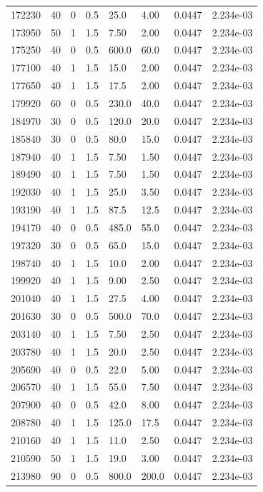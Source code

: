 \documentclass[preview]{standalone}
\begin{document}
{{{{\begin{tabular}{L{1.2cm}C{1.2cm} C{0.3cm}C{0.5cm} C{1.4cm}C{1.4cm} C{1.4cm}C{1.4cm}}
  172230  &    40  & 0     & 0.5 &  25.0  & 4.00  & 0.0447 &  2.234e-03   \\ 
  173950  &    50  & 1     & 1.5 &  7.50  & 2.00  & 0.0447 &  2.234e-03   \\ 
  175250  &    40  & 0     & 0.5 &  600.0  & 60.0  & 0.0447 &  2.234e-03   \\ 
  177100  &    40  & 1     & 1.5 &  15.0  & 2.00  & 0.0447 &  2.234e-03   \\ 
  177650  &    40  & 1     & 1.5 &  17.5  & 2.00  & 0.0447 &  2.234e-03   \\ 
  179920  &    60  & 0     & 0.5 &  230.0  & 40.0  & 0.0447 &  2.234e-03   \\ 
  184970  &    30  & 0     & 0.5 &  120.0  & 20.0  & 0.0447 &  2.234e-03   \\ 
  185840  &    30  & 0     & 0.5 &  80.0  & 15.0  & 0.0447 &  2.234e-03   \\ 
  187940  &    40  & 1     & 1.5 &  7.50  & 1.50  & 0.0447 &  2.234e-03   \\ 
  189490  &    40  & 1     & 1.5 &  7.50  & 1.50  & 0.0447 &  2.234e-03   \\ 
  192030  &    40  & 1     & 1.5 &  25.0  & 3.50  & 0.0447 &  2.234e-03   \\ 
  193190  &    40  & 1     & 1.5 &  87.5  & 12.5  & 0.0447 &  2.234e-03   \\ 
  194170  &    40  & 0     & 0.5 &  485.0  & 55.0  & 0.0447 &  2.234e-03   \\ 
  197320  &    30  & 0     & 0.5 &  65.0  & 15.0  & 0.0447 &  2.234e-03   \\ 
  198740  &    40  & 1     & 1.5 &  10.0  & 2.00  & 0.0447 &  2.234e-03   \\ 
  199920  &    40  & 1     & 1.5 &  9.00  & 2.50  & 0.0447 &  2.234e-03   \\ 
  201040  &    40  & 1     & 1.5 &  27.5  & 4.00  & 0.0447 &  2.234e-03   \\ 
  201630  &    30  & 0     & 0.5 &  500.0  & 70.0  & 0.0447 &  2.234e-03   \\ 
  203140  &    40  & 1     & 1.5 &  7.50  & 2.50  & 0.0447 &  2.234e-03   \\ 
  203780  &    40  & 1     & 1.5 &  20.0  & 2.50  & 0.0447 &  2.234e-03   \\ 
  205690  &    40  & 0     & 0.5 &  22.0  & 5.00  & 0.0447 &  2.234e-03   \\ 
  206570  &    40  & 1     & 1.5 &  55.0  & 7.50  & 0.0447 &  2.234e-03   \\ 
  207900  &    40  & 0     & 0.5 &  42.0  & 8.00  & 0.0447 &  2.234e-03   \\ 
  208780  &    40  & 1     & 1.5 &  125.0  & 17.5  & 0.0447 &  2.234e-03   \\ 
  210160  &    40  & 1     & 1.5 &  11.0  & 2.50  & 0.0447 &  2.234e-03   \\ 
  210590  &    50  & 1     & 1.5 &  19.0  & 3.00  & 0.0447 &  2.234e-03   \\ 
  213980  &    90  & 0     & 0.5 &  800.0  & 200.0  & 0.0447 &  2.234e-03   \\ 
\hline 
\end{tabular} 

}}}}
\end{document}
